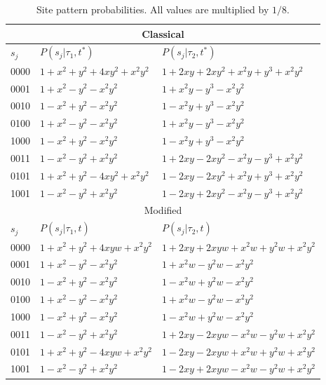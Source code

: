 \documentclass[a4paper]{article}
\begin{document}
\begin{table}
\centering
\begin{tabular}{|l|l|l|}
\multicolumn{3}{c}{Classical}\\
    \hline
$s_j$   &$P(s_j|\tau_1,t^*)$&$P(s_j|\tau_2,t^*)$\\
    \hline
0000&$1+x^2+y^2+4xy^2+x^2y^2$&$1+2xy+2xy^2+x^2y+y^3+x^2y^2$\\
0001&$1+x^2-y^2-x^2y^2$&$1+x^2y-y^3-x^2y^2$\\
0010&$1-x^2+y^2-x^2y^2$&$1-x^2y+y^3-x^2y^2$\\
0100&$1+x^2-y^2-x^2y^2$&$1+x^2y-y^3-x^2y^2$\\
1000&$1-x^2+y^2-x^2y^2$&$1-x^2y+y^3-x^2y^2$\\
0011&$1-x^2-y^2+x^2y^2$&$1+2xy-2xy^2-x^2y-y^3+x^2y^2$\\
0101&$1+x^2+y^2-4xy^2+x^2y^2$&$1-2xy-2xy^2+x^2y+y^3+x^2y^2$\\
1001&$1-x^2-y^2+x^2y^2$&$1-2xy+2xy^2-x^2y-y^3+x^2y^2$\\
    \hline
\multicolumn{3}{c}{Modified}\\
    \hline
$s_j$   &$P(s_j|\tau_1,t)$&$P(s_j|\tau_2,t)$\\
    \hline
0000&$1+x^2+y^2+4xyw+x^2y^2$&$1+2xy+2xyw+x^2w+y^2w+x^2y^2$\\
0001&$1+x^2-y^2-x^2y^2$&$1+x^2w-y^2w-x^2y^2$\\
0010&$1-x^2+y^2-x^2y^2$&$1-x^2w+y^2w-x^2y^2$\\
0100&$1+x^2-y^2-x^2y^2$&$1+x^2w-y^2w-x^2y^2$\\
1000&$1-x^2+y^2-x^2y^2$&$1-x^2w+y^2w-x^2y^2$\\
0011&$1-x^2-y^2+x^2y^2$&$1+2xy-2xyw-x^2w-y^2w+x^2y^2$\\
0101&$1+x^2+y^2-4xyw+x^2y^2$&$1-2xy-2xyw+x^2w+y^2w+x^2y^2$\\
1001&$1-x^2-y^2+x^2y^2$&$1-2xy+2xyw-x^2w-y^2w+x^2y^2$\\
    \hline
\end{tabular}
\caption{Site pattern probabilities.
All values are multiplied by $1/8$.}
\label{tab:sitepatprob}
\end{table}
\end{document}
